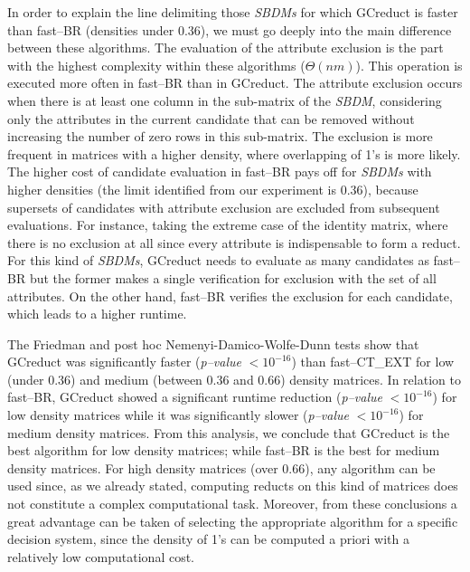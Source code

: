 \documentclass[letterpaper, twoside, openright, 12pt]{book}%
\begin{document}
	In order to explain the line delimiting those \textit{SBDMs} for which GCreduct is faster than fast--BR (densities under 0.36), we must go deeply into the main difference between these algorithms. The evaluation of the attribute exclusion is the part with the highest complexity within these algorithms ($\Theta (nm)$). This operation is executed more often in fast--BR than in GCreduct. The attribute exclusion occurs when there is at least one column in the sub-matrix of the \textit{SBDM}, considering only the attributes in the current candidate that can be removed without increasing the number of zero rows in this sub-matrix. The exclusion is more frequent in matrices with a higher density, where overlapping of 1's is more likely. The higher cost of candidate evaluation in fast--BR pays off for \textit{SBDMs} with higher densities (the limit identified from our experiment is 0.36), because supersets of candidates with attribute exclusion are excluded from subsequent evaluations. For instance, taking the extreme case of the identity matrix, where there is no exclusion at all since every attribute is indispensable to form a reduct. For this kind of \textit{SBDMs}, GCreduct needs to evaluate as many candidates as fast--BR but the former makes a single verification for exclusion with the set of all attributes. On the other hand, fast--BR verifies the exclusion for each candidate, which leads to a higher runtime.
	
	The Friedman and post hoc Nemenyi-Damico-Wolfe-Dunn tests show that GCreduct was significantly faster (\textit{p--value} $< 10^{-16}$) than fast--CT\_EXT for low (under 0.36) and medium (between 0.36 and 0.66) density matrices. In relation to fast--BR, GCreduct showed a significant runtime reduction (\textit{p--value} $< 10^{-16}$) for low density matrices while it was significantly slower (\textit{p--value} $< 10^{-16}$) for medium density matrices. From this analysis, we conclude that GCreduct is the best algorithm for low density matrices; while fast--BR is the best for medium density matrices. For high density matrices (over 0.66), any algorithm can be used since, as we already stated, computing reducts on this kind of matrices does not constitute a complex computational task. Moreover, from these conclusions a great advantage can be taken of selecting the appropriate algorithm for a specific decision system, since the density of 1's can be computed a priori with a relatively low computational cost.
	
\end{document}
